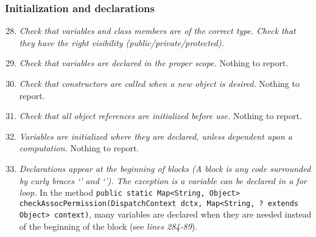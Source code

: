 	\subsubsection{Initialization and declarations}
		\begin{enumerate}
			\setcounter{enumi}{27}
			\item \textit{Check that variables and class members are of the correct type. Check that they have the right visibility (public/private/protected).}\newline

			\item \textit{Check that variables are declared in the proper scope.}\newline
			Nothing to report. %

			\item \textit{Check that constructors are called when a new object is desired.}\newline
			Nothing to report. %

			\item \textit{Check that all object references are initialized before use.}\newline
			Nothing to report. %

			\item \textit{Variables are initialized where they are declared, unless dependent upon a computation.}\newline
			Nothing to report. %

			\item \textit{Declarations appear at the beginning of blocks (A block is any code surrounded by curly braces ‘{’ and ‘}’). The exception is a variable can be declared in a for loop.}\newline
			In the method \texttt{public static Map<String, Object> checkAssocPermission(DispatchContext dctx, Map<String, ? extends Object> context)}, many variables are declared when they are needed instead of the beginning of the block (see \textit{lines 284-89}). 

		\end{enumerate}

